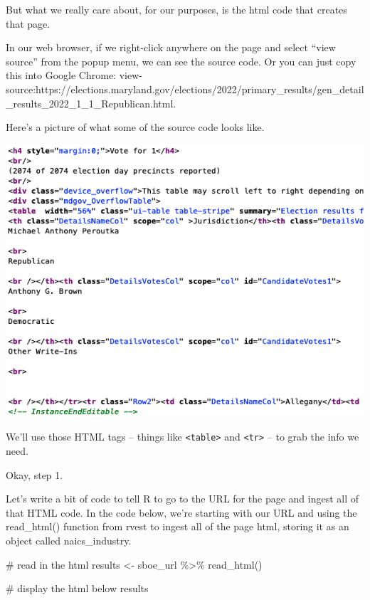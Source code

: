 \documentclass[
  letterpaper,
  DIV=11,
  numbers=noendperiod]{scrreprt}
\newenvironment{Shaded}{\begin{snugshade}}{\end{snugshade}}
\newcommand{\CommentTok}[1]{\textcolor[rgb]{0.37,0.37,0.37}{#1}}
\newcommand{\FunctionTok}[1]{\textcolor[rgb]{0.28,0.35,0.67}{#1}}
\newcommand{\NormalTok}[1]{\textcolor[rgb]{0.00,0.23,0.31}{#1}}
\newcommand{\OtherTok}[1]{\textcolor[rgb]{0.00,0.23,0.31}{#1}}
\newcommand{\SpecialCharTok}[1]{\textcolor[rgb]{0.37,0.37,0.37}{#1}}
\begin{document}
But what we really care about, for our purposes, is the html code that
creates that page.

In our web browser, if we right-click anywhere on the page and select
``view source'' from the popup menu, we can see the source code. Or you
can just copy this into Google Chrome:
view-source:https://elections.maryland.gov/elections/2022/primary\_results/gen\_detail\_results\_2022\_1\_1\_Republican.html.

Here's a picture of what some of the source code looks like.

\includegraphics{./images/rvest2.png}

We'll use those HTML tags -- things like
\texttt{\textless{}table\textgreater{}} and
\texttt{\textless{}tr\textgreater{}} -- to grab the info we need.

Okay, step 1.

Let's write a bit of code to tell R to go to the URL for the page and
ingest all of that HTML code. In the code below, we're starting with our
URL and using the read\_html() function from rvest to ingest all of the
page html, storing it as an object called naics\_industry.

\begin{Shaded}
\begin{Highlighting}[]
\CommentTok{\# read in the html}
\NormalTok{results }\OtherTok{\textless{}{-}}\NormalTok{ sboe\_url }\SpecialCharTok{\%\textgreater{}\%}
  \FunctionTok{read\_html}\NormalTok{()}

\CommentTok{\# display the html below}
\NormalTok{results}
\end{Highlighting}
\end{Shaded}
\end{document}
